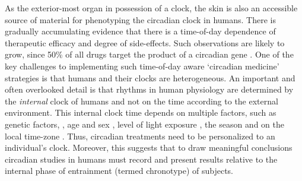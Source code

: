 As the exterior-most organ in possession of a clock, the skin is also an accessible source of material for phenotyping the circadian clock in humans. There is gradually accumulating evidence that there is a time-of-day dependence of therapeutic efficacy and degree of side-effects\cite{Montaigne2018,Dallmann2016,Long2016}. Such observations are likely to grow, since 50\% of all drugs target the product of a circadian gene \cite{Ruben2018, Zhang2014}. One of the key challenges to implementing such time-of-day aware `circadian medicine' strategies is that humans and their clocks are heterogeneous. An important and often overlooked detail is that rhythms in human physiology are determined by the \textit{internal} clock of humans and not on the time according to the external environment. This internal clock time depends on multiple factors, such as genetic factors, \cite{Hsu2015, Brown2008}, age and sex \cite{Roenneberg2007}, level of light exposure \cite{Stothard2017, Wright2013}, the season \cite{Stothard2017, Allebrandt2014} and on the local time-zone \cite{Roenneberg2007}. Thus, circadian treatments need to be personalized to an individual's clock. Moreover, this suggests that to draw meaningful conclusions circadian studies in humans must record and present results relative to the internal phase of entrainment (termed chronotype) of subjects.

